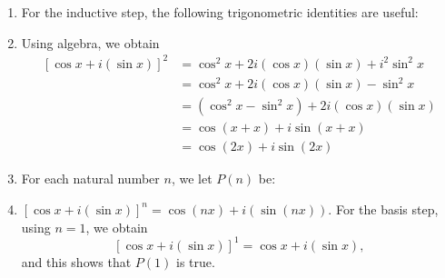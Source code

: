 \documentclass[11pt]{article}
\begin{document}
\begin{enumerate}
\item For the inductive step, the following trigonometric identities are useful:

\item Using algebra, we obtain
\begin{align*}
\left[ {\cos x + i(\sin x)} \right]^2 &= \cos^2 x + 2i (\cos x)(\sin x) + i^2 \sin^2 x \\
                                      &= \cos^2 x + 2i (\cos x)(\sin x) - \sin^2 x \\
                                      &= \left( \cos^2 x - \sin^2 x \right) + 2i (\cos x)(\sin x) \\
                                      &= \cos(x + x) + i \sin(x + x) \\
                                      &= \cos (2x) + i \sin(2x)
\end{align*}

\item For each natural number $n$, we let $P(n)$ be:  
\item $\left[ {\cos x + i(\sin x)} \right]^n  = \cos (nx) + i( {\sin (nx)} )$.  For the basis step, using $n = 1$, we obtain
\[
\left[ {\cos x + i(\sin x)} \right]^1 = \cos x + i(\sin x),
\]
and this shows that $P(1)$ is true.


\end{enumerate}
\end{document}
